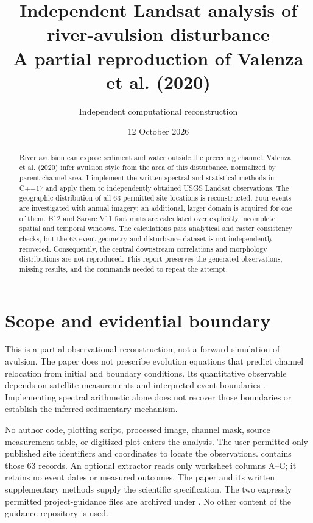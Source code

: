 \documentclass[11pt]{article}
\title{Independent Landsat analysis of river-avulsion disturbance\\
\large A partial reproduction of Valenza et al. (2020)}
\author{Independent computational reconstruction}
\date{12 October 2026}
\newcommand{\artifact}[1]{\path{#1}}
\begin{document}
\maketitle
\begin{abstract}
River avulsion can expose sediment and water outside the preceding channel.
Valenza et al. (2020) infer avulsion style from the area of this disturbance,
normalized by parent-channel area. I implement the written spectral and
statistical methods in C++17 and apply them to independently obtained USGS
Landsat observations. The geographic distribution of all 63 permitted site
locations is reconstructed. Four events are investigated with annual imagery;
an additional, larger domain is acquired for one of them. B12 and Sarare V11
footprints are calculated over explicitly incomplete spatial and temporal windows.
The calculations pass analytical and raster consistency checks, but the
63-event geometry and disturbance dataset is not independently recovered.
Consequently, the central downstream correlations and morphology distributions
are not reproduced. This report preserves the generated observations, missing
results, and the commands needed to repeat the attempt.
\end{abstract}

\section{Scope and evidential boundary}
This is a partial observational reconstruction, not a forward simulation of
avulsion. The paper does not prescribe evolution equations that predict channel
relocation from initial and boundary conditions. Its quantitative observable
depends on satellite measurements and interpreted event boundaries
\cite{valenza}. Implementing spectral arithmetic alone does not recover those
boundaries or establish the inferred sedimentary mechanism.

No author code, plotting script, processed image, channel mask, source
measurement table, or digitized plot enters the analysis. The user permitted
only published site identifiers and coordinates to locate the observations.
\artifact{config/sites.csv} contains those 63 records. An optional extractor
reads only worksheet columns A--C; it retains no event dates or measured
outcomes. The paper and its written supplementary methods supply the scientific
specification. The two expressly permitted project-guidance files are archived
under \artifact{guidance/}. No other content of the guidance repository is used.
\end{document}
